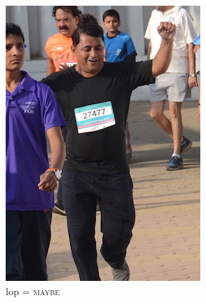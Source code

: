 \begin{figure}[p]
\begin{subfigure}[b]{0.25\textwidth}
    \includegraphics[width=\textwidth]{images/dataset/Prominence_LoP_Maybe}
    \caption{\gls{lop} = \textsc{maybe}}
  \end{subfigure}
  \hspace{\fill}
  \begin{subfigure}[b]{0.25\textwidth}

\end{subfigure}
\end{figure}
